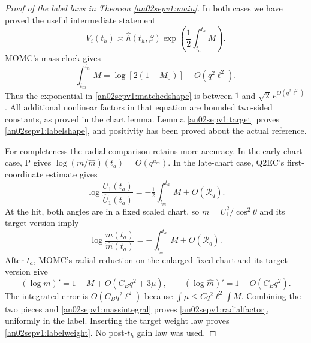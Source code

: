 \documentclass[11pt]{article}
\theoremstyle{remark}\newtheorem{remark}[theorem]{Remark}
\begin{document}
\begin{proof}[Proof of the label laws in Theorem \ref{an02sepv1:main}]
In both cases we have proved the useful intermediate statement
\begin{equation}
 V_i(t_h)\asymp\widehat h(t_h,\beta)
      \exp\left(\frac12\int_{t_a}^{t_h}M\right).
 \label{an02sepv1:matchedshape}
\end{equation}
MOMC's mass clock gives
\begin{equation}
 \int_{t_m}^{t_h}M=\log[2(1-M_0)]+O(q^2\ell^2).
 \label{an02sepv1:massintegral}
\end{equation}
Thus the exponential in \eqref{an02sepv1:matchedshape} is
between $1$ and $\sqrt2\,e^{O(q^2\ell^2)}$.
All additional nonlinear factors in that equation are bounded
two-sided constants, as proved in the chart lemma.
Lemma \ref{an02sepv1:target} proves \eqref{an02sepv1:labelshape},
and positivity has been proved about the actual reference.

For completeness the radial comparison retains more accuracy.
In the early-chart case, P gives
$\log(m/\widehat m)(t_a)=O(q^{u_m})$.
In the late-chart case, Q2EC's first-coordinate estimate gives
\[
 \log\frac{U_1(t_a)}{\widehat U_1(t_a)}
       =-\tfrac12\int_{t_m}^{t_a}M+O(\mathcal R_q).
\]
At the hit, both angles are in a fixed scaled chart, so
$m=U_1^2/\cos^2\theta$ and its target version imply
\[
 \log\frac{m(t_a)}{\widehat m(t_a)}
       =-\int_{t_m}^{t_a}M+O(\mathcal R_q).
\]
After $t_a$, MOMC's radial reduction on the enlarged fixed chart
and its target version give
\[
 (\log m)'=1-M+O(C_Bq^2+3\mu),\qquad
 (\log\widehat m)'=1+O(C_Bq^2).
\]
The integrated error is $O(C_Bq^2\ell^2)$ because
$\int\mu\le Cq^2\ell^2\int M$.
Combining the two pieces and \eqref{an02sepv1:massintegral}
proves \eqref{an02sepv1:radialfactor}, uniformly in the label.
Inserting the target weight law proves
\eqref{an02sepv1:labelweight}. No post-$t_h$ gain law was used.
\end{proof}
\end{document}
